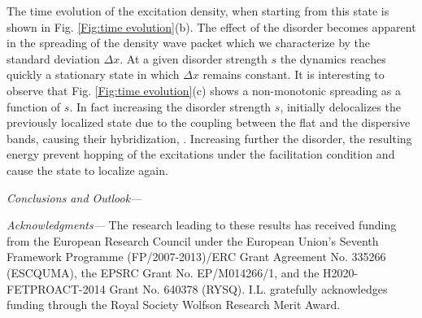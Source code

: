 \documentclass[prl,aps,twocolumn,showpacs,superscriptaddress,longbibliography]{revtex4-1}
\begin{document}

The time evolution of the excitation density, when starting from this state is shown in Fig. \ref{Fig:time evolution}(b). The effect of the disorder becomes apparent in the spreading of the density wave packet which we characterize by the standard deviation $\Delta x$. At a given disorder strength $s$ the dynamics reaches quickly a stationary state in which $\Delta x$ remains constant. It is interesting to observe that Fig. \ref{Fig:time evolution}(c) shows a non-monotonic spreading as a function of $s$. In fact increasing the disorder strength $s$, initially delocalizes the previously localized state  due to the coupling between the flat and the dispersive bands, causing their hybridization, \cite{Leykam2017}. Increasing further the disorder, the resulting energy prevent hopping of the excitations under the facilitation condition and cause the state to localize again.

\emph{Conclusions and Outlook---}

\emph{Acknowledgments---} The research  leading  to  these  results  has  received  funding  from the European Research Council under the European Union’s Seventh Framework Programme (FP/2007-2013)/ERC Grant Agreement No.
335266 (ESCQUMA), the EPSRC Grant No. EP/M014266/1, and the H2020-FETPROACT-2014 Grant No. 640378 (RYSQ). I.L. gratefully acknowledges funding through the Royal Society Wolfson Research Merit Award. 




\end{document}
